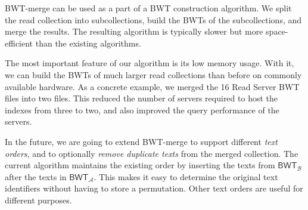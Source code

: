 \documentclass[smallabstract,smallcaptions]{dccpaper}
\newcommand{\BWT}{\textsf{BWT}}
\newcommand{\mSA}{\ensuremath{\mathsf{SA}}}
\newcommand{\mBWT}{\ensuremath{\mathsf{BWT}}}
\newcommand{\mLF}{\ensuremath{\mathsf{LF}}}
\newcommand{\mselect}{\ensuremath{\mathsf{select}}}
\newcommand{\Acoll}{\ensuremath{\mathcal{A}}}
\newcommand{\Bcoll}{\ensuremath{\mathcal{B}}}
\newcommand{\BWTmerge}{\textsf{BWT\nobreakdash-merge}}
\begin{document}
\BWTmerge{} can be used as a part of a \BWT{} construction algorithm. We split the read collection into subcollections, build the \BWT{}s of the subcollections, and merge the results. The resulting algorithm is typically slower but more space-efficient than the existing algorithms.

The most important feature of our algorithm is its low memory usage. With it, we can build the \BWT{}s of much larger read collections than before on commonly available hardware. As a concrete example, we merged the 16 Read Server \BWT{} files into two files. This reduced the number of servers required to host the indexes from three to two, and also improved the query performance of the servers.

In the future, we are going to extend \BWTmerge{} to support different \emph{text orders}, and to optionally \emph{remove duplicate texts} from the merged collection. The current algorithm maintains the existing order by inserting the texts from $\mBWT_{\Bcoll}$ after the texts in $\mBWT_{\Acoll}$. This makes it easy to determine the original text identifiers without having to store a permutation. Other text orders are useful for different purposes.

%




\end{document}
